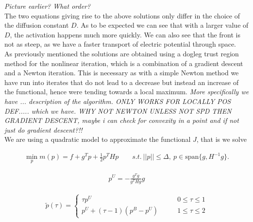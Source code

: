 \documentclass[../draft_1.tex]{subfiles}
\begin{document}
\textit{Picture earlier? What order?} 
\smallskip
\\
The two equations giving rise to the above solutions only differ in the choice of the diffusion constant $D$. As to be expected we can see that with a larger value of $D$, the activation happens much more quickly. We can also see that the front is not as steep, as we have a faster transport of electric potential through space. 
\smallskip
\\
As previously mentioned the solutions are obtained using a dogleg trust region method for the nonlinear iteration, which is a combination of a gradient descent and a Newton iteration. This is necessary as with a simple Newton method we have run into iterates that do not lead to a decrease but instead an increase of the functional, hence were tending towards a local maximum.  \textit{More specifically we have ... description of the algorithm. ONLY WORKS FOR LOCALLY POS DEF.....	which we have. WHY NOT NEWTON UNLESS NOT SPD THEN GRADIENT DESCENT, maybe i can check for convexity in a point and if not just do gradient descent?!!} 	
\smallskip
\\
We are using a quadratic model to approximate the functional $J$, that is we solve

\begin{ceqn}
	\begin{equation}
	\begin{aligned}
	\min_p m(p) = f + g^T p + \frac{1}{2} p^T H p \qquad s.t. \ ||p|| \leq \Delta, \ p \in \text{span}\{g, H^{-1}g\}. 
	\end{aligned}
	\end{equation}
\end{ceqn}

\begin{ceqn}
	\begin{equation}
	\begin{aligned}
	p^U = - \frac{g^Tg}{g^T H g} g
	\end{aligned}
	\end{equation}
\end{ceqn}

\begin{ceqn}
	\begin{equation}
	\begin{aligned}
	\tilde{p}(\tau) = \begin{cases}
	\tau p^U \qquad &0 \leq \tau \leq 1 \\
	p^U + (\tau - 1)(p^B - p^U) \qquad &1 \leq \tau \leq 2
	\end{cases}
	\end{aligned}
	\end{equation}
\end{ceqn}
\end{document}
